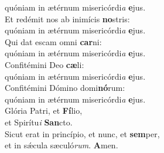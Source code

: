 \evenverse quóniam in ætérnum misericórdi\textit{a} \textbf{e}jus.\\
\oddverse Et redémit nos ab inimícis \textbf{no}stris:~\*\\
\oddverse quóniam in ætérnum misericórdi\textit{a} \textbf{e}jus.\\
\evenverse Qui dat escam omni \textbf{car}ni:~\*\\
\evenverse quóniam in ætérnum misericórdi\textit{a} \textbf{e}jus.\\
\oddverse Confitémini Deo \textbf{cæ}li:~\*\\
\oddverse quóniam in ætérnum misericórdi\textit{a} \textbf{e}jus.\\
\evenverse Confitémini Dómino domi\textbf{nó}rum:~\*\\
\evenverse quóniam in ætérnum misericórdi\textit{a} \textbf{e}jus.\\
\oddverse Glória Patri, et \textbf{Fí}lio,~\*\\
\oddverse et Spirítu\textit{i} \textbf{San}cto.\\
\evenverse Sicut erat in princípio, et nunc, et \textbf{sem}per,~\*\\
\evenverse et in sǽcula sæculó\textit{rum}. \textbf{A}men.\\
